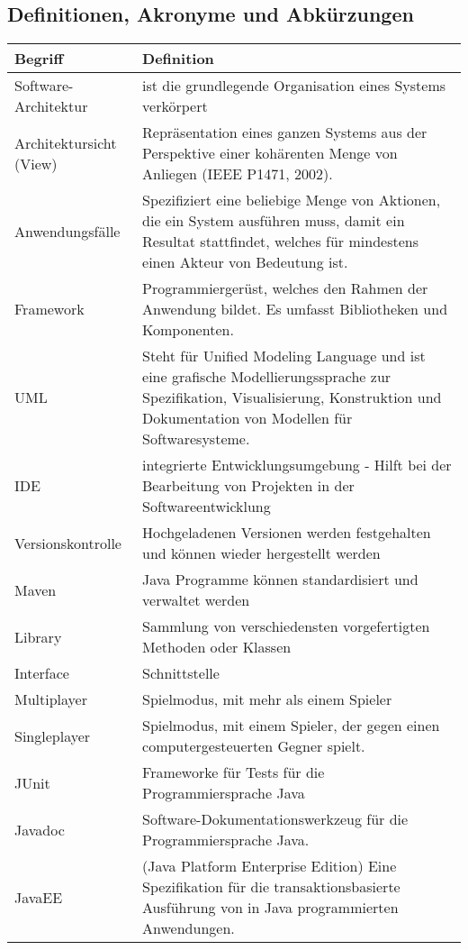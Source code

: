 \documentclass[fontsize=12pt,paper=a4,twoside]{scrartcl}
\begin{document}
\subsection{Definitionen, Akronyme und Abkürzungen}
  \begin{longtable}{ |  l | p{12cm} |}
    \hline
    Begriff & Definition \\ \hline
Software-Architektur &ist die grundlegende Organisation eines
Systems verkörpert \\ \hline
Architektursicht (View) &Repräsentation eines ganzen Systems
aus der Perspektive einer kohärenten Menge von
Anliegen (IEEE P1471, 2002). \\ \hline
 Anwendungsfälle & Spezifiziert eine beliebige Menge von Aktionen, die
ein System ausführen muss, damit ein Resultat stattfindet,
welches für mindestens einen Akteur von Bedeutung
ist. \\ \hline
    Framework &Programmiergerüst, welches den Rahmen der Anwendung
bildet. Es umfasst Bibliotheken und Komponenten. \\ \hline
    UML &Steht für Unified Modeling Language und ist eine grafische
Modellierungssprache zur Spezifikation, Visualisierung,
Konstruktion und Dokumentation von Modellen
für Softwaresysteme. \\
    \hline
IDE & integrierte Entwicklungsumgebung - Hilft bei der Bearbeitung von Projekten
in der Softwareentwicklung \\     \hline
Versionskontrolle  &Hochgeladenen Versionen werden festgehalten und können
wieder hergestellt werden \\     \hline
 Maven  &Java Programme können standardisiert und verwaltet werden\\     \hline
 Library &Sammlung von verschiedensten vorgefertigten Methoden oder Klassen\\     \hline
Interface &Schnittstelle\\     \hline
Multiplayer &Spielmodus, mit mehr als einem Spieler\\    \hline
Singleplayer &Spielmodus, mit einem Spieler, der gegen einen computergesteuerten
Gegner spielt. \\     \hline
JUnit & Frameworke für Tests für die Programmiersprache Java\\     \hline
Javadoc  &Software-Dokumentationswerkzeug für die Programmiersprache Java. \\     \hline
JavaEE &(Java Platform Enterprise Edition) Eine Spezifikation für die transaktionsbasierte 
Ausführung von in Java programmierten Anwendungen.\\    \hline

\end{longtable}
\end{document}
